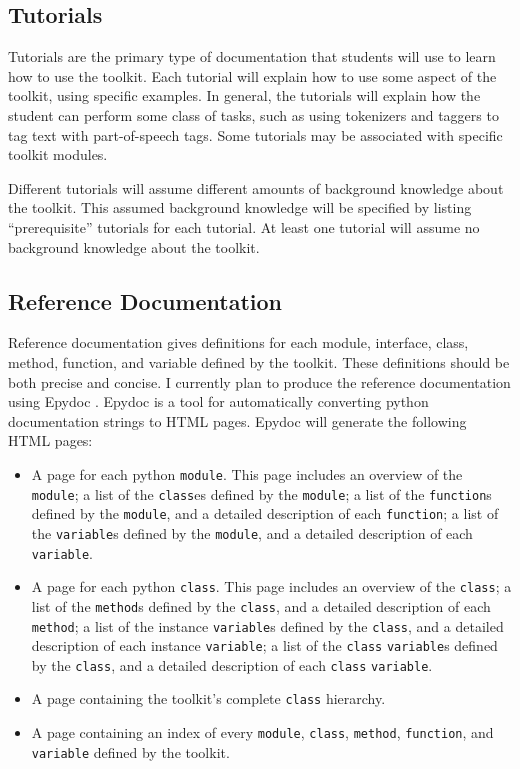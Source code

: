 \documentclass{article}
\begin{document}
\subsection{Tutorials}

Tutorials are the primary type of documentation that students will use
to learn how to use the toolkit.  Each tutorial will explain how to
use some aspect of the toolkit, using specific examples.  In general,
the tutorials will explain how the student can perform some class of
tasks, such as using tokenizers and taggers to tag text with
part-of-speech tags.  Some tutorials may be associated with specific
toolkit modules.

Different tutorials will assume different amounts of background
knowledge about the toolkit.  This assumed background knowledge will
be specified by listing ``prerequisite'' tutorials for each tutorial.
At least one tutorial will assume no background knowledge about the
toolkit.

\subsection{Reference Documentation}

Reference documentation gives definitions for each module, interface,
class, method, function, and variable defined by the toolkit.  These
definitions should be both precise and concise.  I currently plan to
produce the reference documentation using Epydoc \cite{epydoc}.
Epydoc is a tool for automatically converting python documentation
strings to HTML pages.  Epydoc will generate the following HTML pages:

\begin{itemize}
  \item A page for each python \texttt{module}.  This page includes an
  overview of the \texttt{module}; a list of the \texttt{class}es
  defined by the \texttt{module}; a list of the \texttt{function}s
  defined by the \texttt{module}, and a detailed description of each
  \texttt{function}; a list of the \texttt{variable}s defined by the
  \texttt{module}, and a detailed description of each
  \texttt{variable}.

  \item A page for each python \texttt{class}.  This page includes an
  overview of the \texttt{class}; a list of the \texttt{method}s
  defined by the \texttt{class}, and a detailed description of each
  \texttt{method}; a list of the instance \texttt{variable}s defined
  by the \texttt{class}, and a detailed description of each instance
  \texttt{variable}; a list of the \texttt{class} \texttt{variable}s
  defined by the \texttt{class}, and a detailed description of each
  \texttt{class} \texttt{variable}.

  \item A page containing the toolkit's complete \texttt{class}
  hierarchy.

  \item A page containing an index of every \texttt{module},
  \texttt{class}, \texttt{method}, \texttt{function}, and
  \texttt{variable} defined by the toolkit.

\end{itemize}
\end{document}
